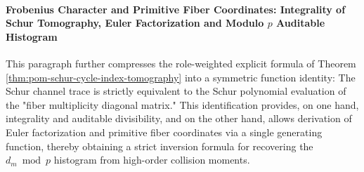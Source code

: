 
\paragraph{Frobenius Character and Primitive Fiber Coordinates: Integrality of Schur Tomography, Euler Factorization and Modulo \texorpdfstring{$p$}{p} Auditable Histogram}
This paragraph further compresses the role-weighted explicit formula of Theorem \ref{thm:pom-schur-cycle-index-tomography} into a symmetric function identity:
The Schur channel trace is strictly equivalent to the Schur polynomial evaluation of the "fiber multiplicity diagonal matrix."
This identification provides, on one hand, integrality and auditable divisibility, and on the other hand, allows derivation of Euler factorization and primitive fiber coordinates via a single generating function,
thereby obtaining a strict inversion formula for recovering the \(d_m\bmod p\) histogram from high-order collision moments.

